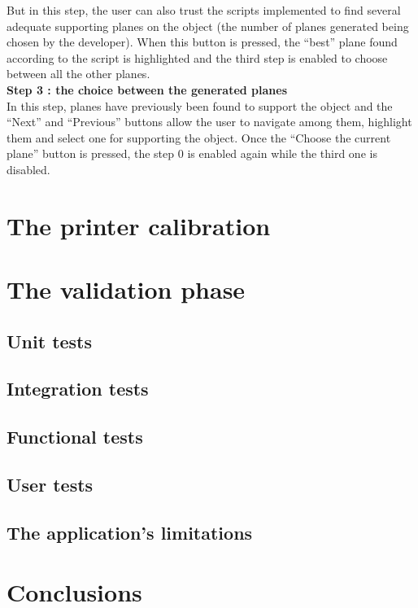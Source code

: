 \documentclass{report}
\begin{document}
But in this step, the user can also trust the scripts implemented to find several adequate supporting planes on the object (the number of planes generated being chosen by the developer). When this button is pressed, the ``best'' plane found according to the script is highlighted and the third step is enabled to choose between all the other planes.\\

\textbf{Step 3 : the choice between the generated planes}\\ 

In this step, planes have previously been found to support the object and the ``Next'' and ``Previous'' buttons allow the user to navigate among them, highlight them and select one for supporting the object. Once the ``Choose the current plane'' button is pressed, the step 0 is enabled again while the third one is disabled. 

\chapter{The printer calibration}

\chapter{The validation phase}

\section{Unit tests}

\section{Integration tests}

\section{Functional tests}

\section{User tests}

\section{The application's limitations}

\chapter{Conclusions}


\appendix
\end{document}
